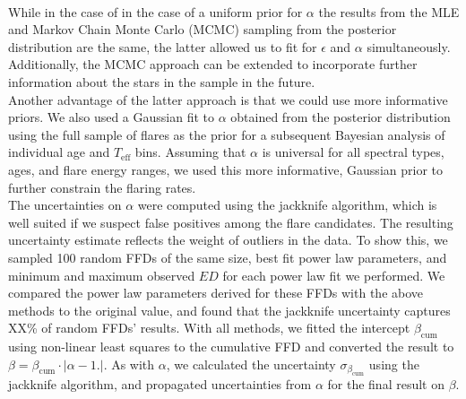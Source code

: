 \documentclass{aa}
\begin{document}
\\
While in the case of in the case of a uniform prior for $\alpha$ the results from the MLE and Markov Chain Monte Carlo (MCMC) sampling from the posterior distribution are the same, the latter allowed us to fit for $\epsilon$ and $\alpha$ simultaneously. Additionally, the MCMC approach can be extended to incorporate further information about the stars in the sample in the future.
\\
Another advantage of the latter approach is that we could use more informative priors. We also used a Gaussian fit to $\alpha$ obtained from the posterior distribution using the full sample of flares as the prior for a subsequent Bayesian analysis of individual age and $T_\mathrm{eff}$ bins. Assuming that $\alpha$ is universal for all spectral types, ages, and flare energy ranges, we used this more informative, Gaussian prior to further constrain the flaring rates.
\\
The uncertainties on $\alpha$ were computed using the jackknife algorithm, which is well suited if we suspect false positives among the flare candidates. The resulting uncertainty estimate reflects the weight of outliers in the data. To show this, we sampled 100 random FFDs of the same size, best fit power law parameters, and minimum and maximum observed $ED$ for each power law fit we performed. We compared the power law parameters derived for these FFDs with the above methods to the original value, and found that the jackknife uncertainty captures XX\% of random FFDs' results. With all methods, we fitted the intercept $\beta_\mathrm{cum}$ using non-linear least squares to the cumulative FFD and converted the result to $\beta = \beta_\mathrm{cum}\cdot|\alpha-1.|$. As with $\alpha$, we calculated the uncertainty $\sigma_{\beta_\mathrm{cum}}$ using the jackknife algorithm, and propagated uncertainties from $\alpha$ for the final result on $\beta$.
\\
\end{document}
